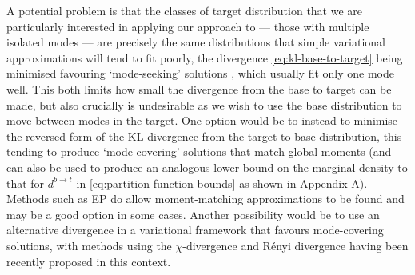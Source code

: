 A potential problem is that the classes of target distribution that we are particularly interested in applying our approach to --- those with multiple isolated modes --- are precisely the same distributions that simple variational approximations will tend to fit poorly, the divergence \eqref{eq:kl-base-to-target} being minimised favouring `mode-seeking' solutions \citep{bishop2006pattern}, which usually fit only one mode well. This both limits how small the divergence from the base to target can be made, but also crucially is undesirable as we wish to use the base distribution to move between modes in the target.
One option would be to instead to minimise the reversed form of the KL divergence from the target to base distribution, this tending to produce `mode-covering' solutions that match global moments (and can also be used to produce an analogous lower bound on the marginal density to that for $d^{b\to t}$ in \eqref{eq:partition-function-bounds} as shown in Appendix A). Methods such as \ac{EP} \citep{minka2001expectation} do allow moment-matching approximations to be found and may be a good option in some cases. Another possibility would be to use an alternative divergence in a variational framework that favours mode-covering solutions, with methods using the $\chi$-divergence \citep{dieng2016chi} and R\'enyi divergence \citep{li2016renyi} having been recently proposed in this context.

